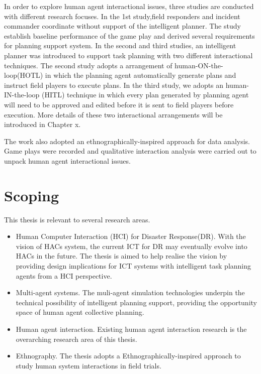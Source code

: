 In order to explore human agent interactional issues, three studies are conducted with different research focuses. In the 1st study,field responders and incident commander coordinate without support of the intelligent planner. The study establish baseline performance of the game play and derived several requirements for planning support system. In the second and third studies, an intelligent planner was introduced to support task planning with two different interactional techniques. The second study adopts a arrangement of human-ON-the-loop(HOTL) in which the planning agent automatically generate plans and instruct field players to execute plans. In the third study, we adopts an human-IN-the-loop (HITL) technique in which every plan generated by planning agent will need to be approved and edited before it is sent to field players before execution. More details of these two interactional arrangements will be introduced in Chapter x.

The work also adopted an ethnographically-inspired approach for data analysis. Game plays were recorded and qualitative interaction analysis were carried out to unpack human agent interactional issues.\\


\section{Scoping}\label{sec:custom}

This thesis is relevant to several research areas. \\

\begin{itemize}
  
  \item Human Computer Interaction (HCI) for Disaster Response(DR). With the vision of HACs system, the current ICT for DR may eventually evolve into HACs in the future. The thesis is aimed to help realise the vision by providing design implications for ICT systems with intelligent task planning agents from a HCI perspective. 
  \item Multi-agent systems. The muli-agent simulation technologies underpin the technical possibility of intelligent planning support, providing the opportunity space of human agent collective planning. 
  \item Human agent interaction. Existing human agent interaction research is the overarching research area of this thesis. 
  \item Ethnography. The thesis adopts a Ethnographically-inspired approach to study human system interactions in field trials.
\end{itemize}

